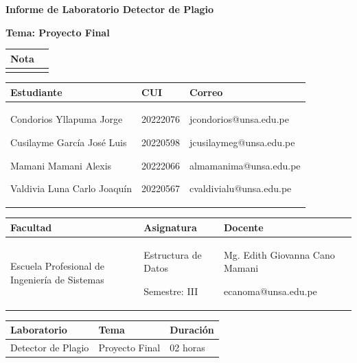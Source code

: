 \documentclass{article}
\makeatletter
\newcommand{\itemEmail}{jcondorios@unsa.edu.pe \par jcusilaymeg@unsa.edu.pe \par almamanima@unsa.edu.pe \par cvaldivialu@unsa.edu.pe}
\newcommand{\itemStudent}{Condorios Yllapuma Jorge \par Cusilayme García José Luis \par Mamani Mamani Alexis \par Valdivia Luna Carlo Joaquín}
\newcommand{\itemProffesor}{Mg. Edith Giovanna Cano Mamani}
\newcommand{\itemProffEmail}{ecanoma@unsa.edu.pe}
\newcommand{\itemCourse}{Estructura de Datos}
\newcommand{\itemCourseCode}{20222076 \par 20220598 \par 20222066  \par 20220567}
\newcommand{\itemSemester}{III}
\newcommand{\itemSchool}{Escuela Profesional de Ingeniería de Sistemas}
\newcommand{\itemPracticeNumber}{Detector de Plagio}
\newcommand{\itemTheme}{Proyecto Final}
\makeatother
\begin{document}
	
	\vspace*{10px}
	
	\begin{center}	
		\fontsize{17}{17} \textbf{ Informe de Laboratorio \itemPracticeNumber}
	\end{center}
	\centerline{\textbf{\Large Tema: \itemTheme}}

	\begin{flushright}
		\begin{tabular}{|M{2.5cm}|N|}
			\hline 
			\color{white} \textbf{Nota}  \\
			\hline 
			     \\[30pt]
			\hline 			
		\end{tabular}
	\end{flushright}	

	\begin{table}[H]
		\begin{tabular}{|x{4.7cm}|x{4.8cm}|x{4.8cm}|}
			\hline 
			\color{white} \textbf{Estudiante} & \color{white}\textbf{CUI}  & \color{white}\textbf{Correo} \\
			\hline 
			{\itemStudent} & {\itemCourseCode} & {\itemEmail }     \\
			\hline 			
		\end{tabular}
	\end{table}		
	
	\begin{table}[H]
		\begin{tabular}{|x{4.7cm}|x{4.8cm}|x{4.8cm}|}
			\hline 
			\color{white} \textbf{Facultad} & \color{white}\textbf{Asignatura}  & \color{white}\textbf{Docente}\\
			\hline 
			{\itemSchool} & {\itemCourse \par Semestre: \itemSemester}   & {\itemProffesor \par \itemProffEmail} \\
			\hline 			
		\end{tabular}
	\end{table}	
	
	\begin{table}[H]
		\begin{tabular}{|x{4.7cm}|x{4.8cm}|x{4.8cm}|}
			\hline 
			\color{white}\textbf{Laboratorio} & \color{white}\textbf{Tema}  & \color{white}\textbf{Duración}   \\
			\hline 
			\itemPracticeNumber & \itemTheme & 02 horas   \\
			\hline 
		\end{tabular}
	\end{table}
	
\end{document}
